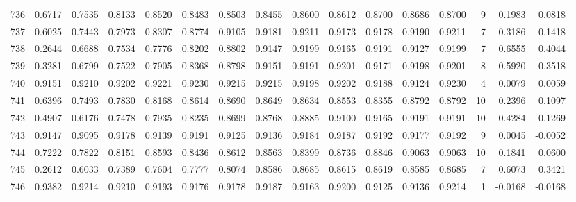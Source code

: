 \begin{tabular}{lrrrrrrrrrrrrrrr}
736 &      0.6717 &  0.7535 &  0.8133 &  0.8520 &  0.8483 &  0.8503 &  0.8455 &  0.8600 &  0.8612 &  0.8700 &   0.8686 &     0.8700 &      9 &                    0.1983 &                     0.0818 \\
737 &      0.6025 &  0.7443 &  0.7973 &  0.8307 &  0.8774 &  0.9105 &  0.9181 &  0.9211 &  0.9173 &  0.9178 &   0.9190 &     0.9211 &      7 &                    0.3186 &                     0.1418 \\
738 &      0.2644 &  0.6688 &  0.7534 &  0.7776 &  0.8202 &  0.8802 &  0.9147 &  0.9199 &  0.9165 &  0.9191 &   0.9127 &     0.9199 &      7 &                    0.6555 &                     0.4044 \\
739 &      0.3281 &  0.6799 &  0.7522 &  0.7905 &  0.8368 &  0.8798 &  0.9151 &  0.9191 &  0.9201 &  0.9171 &   0.9198 &     0.9201 &      8 &                    0.5920 &                     0.3518 \\
740 &      0.9151 &  0.9210 &  0.9202 &  0.9221 &  0.9230 &  0.9215 &  0.9215 &  0.9198 &  0.9202 &  0.9188 &   0.9124 &     0.9230 &      4 &                    0.0079 &                     0.0059 \\
741 &      0.6396 &  0.7493 &  0.7830 &  0.8168 &  0.8614 &  0.8690 &  0.8649 &  0.8634 &  0.8553 &  0.8355 &   0.8792 &     0.8792 &     10 &                    0.2396 &                     0.1097 \\
742 &      0.4907 &  0.6176 &  0.7478 &  0.7935 &  0.8235 &  0.8699 &  0.8768 &  0.8885 &  0.9100 &  0.9165 &   0.9191 &     0.9191 &     10 &                    0.4284 &                     0.1269 \\
743 &      0.9147 &  0.9095 &  0.9178 &  0.9139 &  0.9191 &  0.9125 &  0.9136 &  0.9184 &  0.9187 &  0.9192 &   0.9177 &     0.9192 &      9 &                    0.0045 &                    -0.0052 \\
744 &      0.7222 &  0.7822 &  0.8151 &  0.8593 &  0.8436 &  0.8612 &  0.8563 &  0.8399 &  0.8736 &  0.8846 &   0.9063 &     0.9063 &     10 &                    0.1841 &                     0.0600 \\
745 &      0.2612 &  0.6033 &  0.7389 &  0.7604 &  0.7777 &  0.8074 &  0.8586 &  0.8685 &  0.8615 &  0.8619 &   0.8585 &     0.8685 &      7 &                    0.6073 &                     0.3421 \\
746 &      0.9382 &  0.9214 &  0.9210 &  0.9193 &  0.9176 &  0.9178 &  0.9187 &  0.9163 &  0.9200 &  0.9125 &   0.9136 &     0.9214 &      1 &                   -0.0168 &                    -0.0168 \\

\end{tabular}

